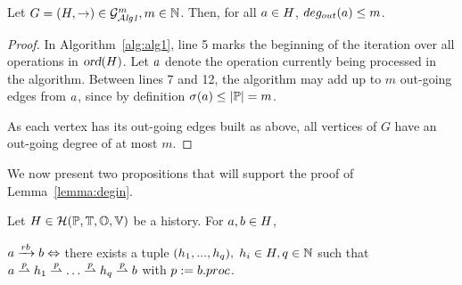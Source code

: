 \documentclass[12pt]{article}
\begin{document}
\begin{lemma}\label{lemma:degout}
Let $G=(H,\rightarrow)\in\mathcal{G}_{\mathcal{A}\emph{lg1}}^m,m\in\mathbb{N}$. Then, for all $a\in H$, \mbox{$deg_{out}(a) \leq m$}.
\end{lemma}
\begin{proof}
In Algorithm~\ref{alg:alg1}, line 5 marks the beginning of the iteration over all operations in $\textsl{ord}(H)$.
Let $a$ denote the operation currently being processed in the algorithm. Between lines 7 and 12, the algorithm may add up to $m$ out-going edges from $a$, since by definition $\sigma(a)\leq |\mathbb{P}|=m$.

As each vertex has its out-going edges built as above, all vertices of $G$ have an out-going degree of at most $m$.

\end{proof}

We now present two propositions that will support the proof of Lemma~\ref{lemma:degin}.

\begin{proposition}\label{prop:finishesBeforeCollection}
Let $H\in\mathcal{H}(\mathbb{P}, \mathbb{T}, \mathbb{O}, \mathbb{V})$ be a history. For $a,b \in H$,

\begin{center}
$a\xrightarrow{rb}b \Leftrightarrow $ there exists a tuple $(h_1,...,h_q),\; h_i \in H, q\in\mathbb{N}$ such that 
$a \stackrel{p}{\rightharpoonup} h_1 \stackrel{p}{\rightharpoonup} \hdots \stackrel{p}{\rightharpoonup} h_q \stackrel{p}{\rightharpoonup} b$ with  $p:=b.proc$.
\end{center}
\end{proposition}
\end{document}
